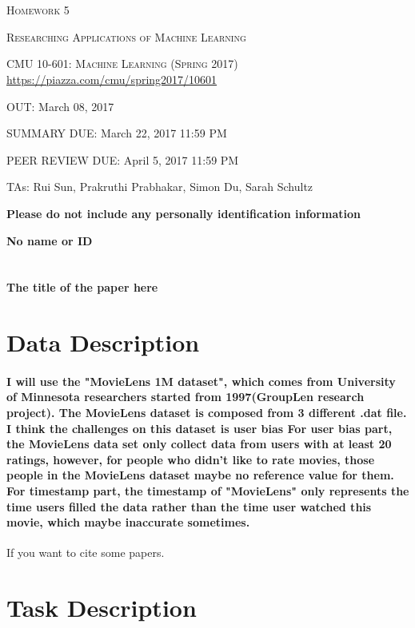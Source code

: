 \documentclass{article}
\begin{document}
\section*{}
\begin{center}
  \centerline{\textsc{\LARGE Homework 5}}
  \vspace{0.5em}
  \centerline{\textsc{\Large Researching Applications of Machine Learning}}
  \vspace{1em}
  \textsc{\large CMU 10-601: Machine Learning (Spring 2017)} \\
  \url{https://piazza.com/cmu/spring2017/10601}
  \centerline{OUT: March 08, 2017}
  \centerline{SUMMARY DUE: March 22, 2017 11:59 PM}
  \centerline{PEER REVIEW DUE: April 5, 2017 11:59 PM} 
  \centerline{TAs: Rui Sun, Prakruthi Prabhakar, Simon Du, Sarah Schultz}
  \centerline{\textbf{\Large Please do not include any personally identification information}}
   \centerline{\textbf{\Large No name or ID}}
\end{center}



\section*{}
\begin{center}
\centerline{\textbf{\Large The title of the paper here}}
\end{center}
\section{Data Description}
\paragraph{I will use the "MovieLens 1M dataset", which comes from University of Minnesota researchers started from 1997(GroupLen research project). The MovieLens dataset is composed from 3 different .dat file. I think the challenges on this dataset is user bias For user bias part, the MovieLens data set only collect data from users with at least 20 ratings, however, for people who didn't like to rate movies, those people in the MovieLens dataset maybe no reference value for them. For timestamp part, the timestamp of "MovieLens" only represents the time users filled the data rather than the time user watched this movie, which maybe inaccurate sometimes.
}
If you want to cite some papers.~\cite{latexcompanion}
\section{Task Description}
\end{document}
